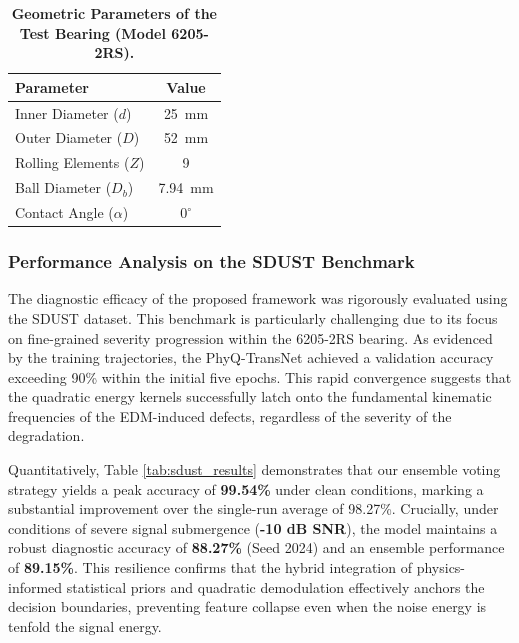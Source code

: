 \documentclass[5p,times,twocolumn]{elsarticle}
\begin{document}
\begin{table}[htbp]
\centering
\caption{\textbf{Geometric Parameters of the Test Bearing (Model 6205-2RS).}}
\label{tab:bearing_params}
\begin{tabular}{l c}
\toprule
\textbf{Parameter} & \textbf{Value} \\ \midrule
Inner Diameter ($d$) & \SI{25}{mm} \\
Outer Diameter ($D$) & \SI{52}{mm} \\
Rolling Elements ($Z$) & 9 \\
Ball Diameter ($D_b$) & \SI{7.94}{mm} \\
Contact Angle ($\alpha$) & $0^\circ$ \\ \bottomrule
\end{tabular}
\end{table}

\subsubsection{Performance Analysis on the SDUST Benchmark}
The diagnostic efficacy of the proposed framework was rigorously evaluated using the SDUST dataset. This benchmark is particularly challenging due to its focus on fine-grained severity progression within the 6205-2RS bearing. As evidenced by the training trajectories, the PhyQ-TransNet achieved a validation accuracy exceeding 90\% within the initial five epochs. This rapid convergence suggests that the quadratic energy kernels successfully latch onto the fundamental kinematic frequencies of the EDM-induced defects, regardless of the severity of the degradation.

Quantitatively, Table \ref{tab:sdust_results} demonstrates that our ensemble voting strategy yields a peak accuracy of \textbf{99.54\%} under clean conditions, marking a substantial improvement over the single-run average of 98.27\%. Crucially, under conditions of severe signal submergence (\textbf{-10 dB SNR}), the model maintains a robust diagnostic accuracy of \textbf{88.27\%} (Seed 2024) and an ensemble performance of \textbf{89.15\%}. This resilience confirms that the hybrid integration of physics-informed statistical priors and quadratic demodulation effectively anchors the decision boundaries, preventing feature collapse even when the noise energy is tenfold the signal energy.
\end{document}
